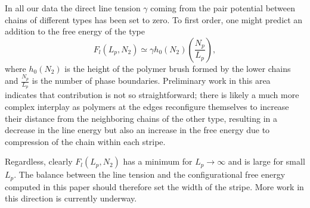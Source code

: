 In all our  data the direct line tension $\gamma$ coming from the pair potential between chains of different types 
has been set to zero. 
To first order, one might predict an addition to the free energy of the type
\begin{equation}
F_l(L_p,N_2)\simeq\gamma h_0(N_2) \left(\frac{N_p}{L_p}\right),
\end{equation}
where $h_0(N_2)$ is the height of the polymer brush formed by the lower chains and $\frac{N_p}{L_p}$ is the number of phase boundaries. 
Preliminary work in this area indicates that contribution is not so straightforward; there is likely a much more complex interplay as polymers at the edges reconfigure themselves to increase their distance from the neighboring chains of the other type, resulting in a decrease in the line energy but also an increase in the free energy due to compression of the chain within each stripe.

Regardless, clearly $F_l(L_p,N_2)$ has a minimum for 
$L_p\rightarrow\infty$ and is large for small $L_p$. The balance between the line tension and the configurational free energy computed in this paper should therefore set the width of the stripe. More work in this direction is currently
underway.
